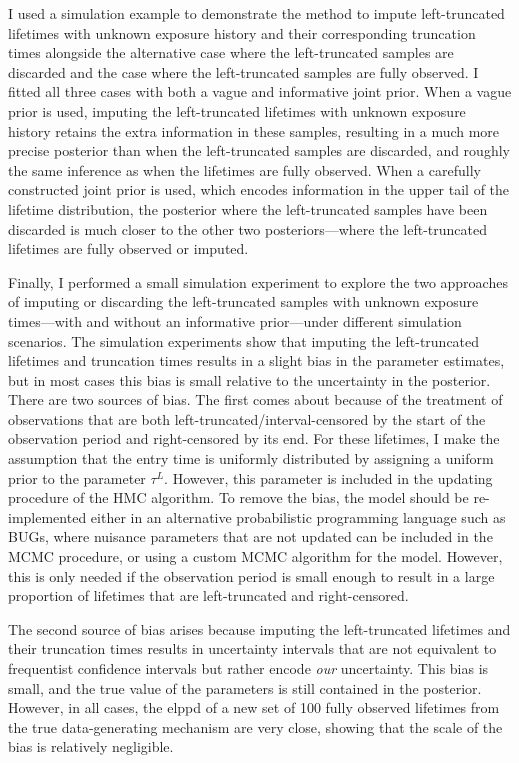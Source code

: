 I used a simulation example to demonstrate the method to impute left-truncated lifetimes with unknown exposure history and their corresponding truncation times alongside the alternative case where the left-truncated samples are discarded and the case where the left-truncated samples are fully observed. I fitted all three cases with both a vague and informative joint prior. When a vague prior is used, imputing the left-truncated lifetimes with unknown exposure history retains the extra information in these samples, resulting in a much more precise posterior than when the left-truncated samples are discarded, and roughly the same inference as when the lifetimes are fully observed. When a carefully constructed joint prior is used, which encodes information in the upper tail of the lifetime distribution, the posterior where the left-truncated samples have been discarded is much closer to the other two posteriors---where the left-truncated lifetimes are fully observed or imputed.

Finally, I performed a small simulation experiment to explore the two approaches of imputing or discarding the left-truncated samples with unknown exposure times---with and without an informative prior---under different simulation scenarios. The simulation experiments show that imputing the left-truncated lifetimes and truncation times results in a slight bias in the parameter estimates, but in most cases this bias is small relative to the uncertainty in the posterior. There are two sources of bias. The first comes about because of the treatment of observations that are both left-truncated/interval-censored by the start of the observation period and right-censored by its end. For these lifetimes, I make the assumption that the entry time is uniformly distributed by assigning a uniform prior to the parameter $\tau^L$. However, this parameter is included in the updating procedure of the HMC algorithm. To remove the bias, the model should be re-implemented either in an alternative probabilistic programming language such as BUGs, where nuisance parameters that are not updated can be included in the MCMC procedure, or using a custom MCMC algorithm for the model. However, this is only needed if the observation period is small enough to result in a large proportion of lifetimes that are left-truncated and right-censored.

The second source of bias arises because imputing the left-truncated lifetimes and their truncation times results in uncertainty intervals that are not equivalent to frequentist confidence intervals but rather encode \textit{our} uncertainty. This bias is small, and the true value of the parameters is still contained in the posterior. However, in all cases, the elppd of a new set of 100 fully observed lifetimes from the true data-generating mechanism are very close, showing that the scale of the bias is relatively negligible.

